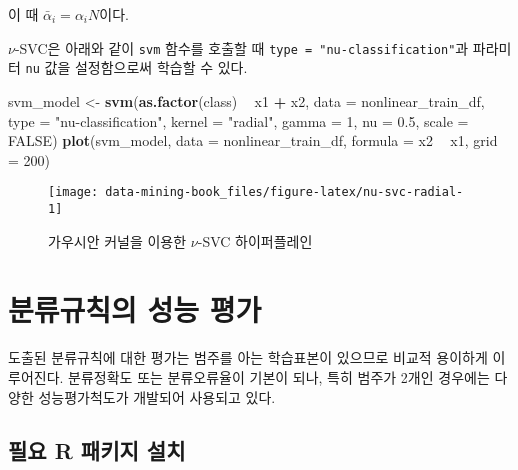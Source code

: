 \documentclass[]{book}
\newenvironment{Shaded}{\begin{snugshade}}{\end{snugshade}}
\newcommand{\DataTypeTok}[1]{\textcolor[rgb]{0.13,0.29,0.53}{#1}}
\newcommand{\DecValTok}[1]{\textcolor[rgb]{0.00,0.00,0.81}{#1}}
\newcommand{\FloatTok}[1]{\textcolor[rgb]{0.00,0.00,0.81}{#1}}
\newcommand{\KeywordTok}[1]{\textcolor[rgb]{0.13,0.29,0.53}{\textbf{#1}}}
\newcommand{\NormalTok}[1]{#1}
\newcommand{\OperatorTok}[1]{\textcolor[rgb]{0.81,0.36,0.00}{\textbf{#1}}}
\newcommand{\OtherTok}[1]{\textcolor[rgb]{0.56,0.35,0.01}{#1}}
\newcommand{\StringTok}[1]{\textcolor[rgb]{0.31,0.60,0.02}{#1}}
\begin{document}
이 때 \(\bar{\alpha}_i = \alpha_i N\)이다.

\(\nu\)-SVC은 아래와 같이 \texttt{svm} 함수를 호출할 때 \texttt{type\ =\ "nu-classification"}과 파라미터 \texttt{nu} 값을 설정함으로써 학습할 수 있다.

\begin{Shaded}
\begin{Highlighting}[]
\NormalTok{svm_model <-}\StringTok{ }\KeywordTok{svm}\NormalTok{(}\KeywordTok{as.factor}\NormalTok{(class) }\OperatorTok{~}\StringTok{ }\NormalTok{x1 }\OperatorTok{+}\StringTok{ }\NormalTok{x2, }\DataTypeTok{data =}\NormalTok{ nonlinear_train_df, }
                 \DataTypeTok{type =} \StringTok{"nu-classification"}\NormalTok{, }
                 \DataTypeTok{kernel =} \StringTok{"radial"}\NormalTok{, }\DataTypeTok{gamma =} \DecValTok{1}\NormalTok{,}
                 \DataTypeTok{nu =} \FloatTok{0.5}\NormalTok{, }\DataTypeTok{scale =} \OtherTok{FALSE}\NormalTok{)}
\KeywordTok{plot}\NormalTok{(svm_model, }\DataTypeTok{data =}\NormalTok{ nonlinear_train_df, }\DataTypeTok{formula =}\NormalTok{ x2 }\OperatorTok{~}\StringTok{ }\NormalTok{x1, }\DataTypeTok{grid =} \DecValTok{200}\NormalTok{)}
\end{Highlighting}
\end{Shaded}

\begin{figure}

{\centering \texttt{[image: data-mining-book\_files/figure-latex/nu-svc-radial-1]} 

}

\caption{가우시안 커널을 이용한 $\nu$-SVC 하이퍼플레인}\label{fig:nu-svc-radial}
\end{figure}

\hypertarget{classifier-evaluation}{%
\chapter{분류규칙의 성능 평가}\label{classifier-evaluation}}

도출된 분류규칙에 대한 평가는 범주를 아는 학습표본이 있으므로 비교적 용이하게 이루어진다. 분류정확도 또는 분류오류율이 기본이 되나, 특히 범주가 2개인 경우에는 다양한 성능평가척도가 개발되어 사용되고 있다.

\hypertarget{classifier-evaluation-packages-install}{%
\section{필요 R 패키지 설치}\label{classifier-evaluation-packages-install}}
\end{document}
